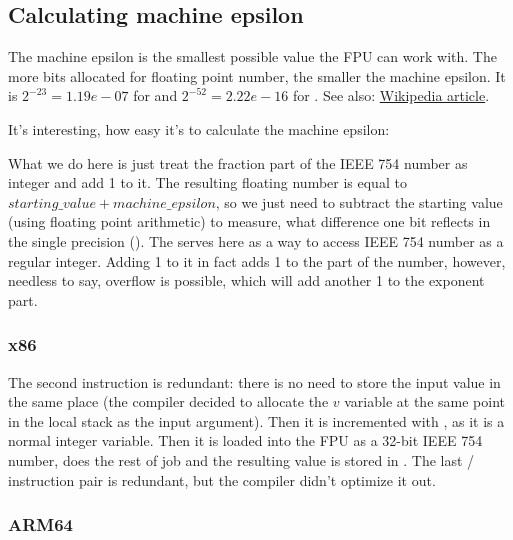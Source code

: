 ﻿\subsection{Calculating machine epsilon}

The machine epsilon is the smallest possible value the \ac{FPU} can work with.
The more bits allocated for floating point number, the smaller the machine epsilon.
It is $2^{-23} = 1.19e-07$ for \Tfloat and $2^{-52} = 2.22e-16$ for \Tdouble.
See also: \href{http://link.yurichev.com/17367}{Wikipedia article}.%

It's interesting, how easy it's to calculate the machine epsilon:



What we do here is just treat the fraction part of the IEEE 754 number as integer and add 1 to it.
The resulting floating number is equal to $starting\_value+machine\_epsilon$, so we just need to subtract
the starting value (using floating point arithmetic) to measure, what difference one bit reflects
in the single precision (\Tfloat).
The  serves here as a way to access IEEE 754 number as a regular integer.
Adding 1 to it in fact adds 1 to the  part of the number, however, needless to say,
overflow is possible, which will add another 1 to the exponent part.

\subsubsection{x86}



The second  instruction is redundant: there is no need to store the input value in the same
place (the compiler decided to allocate the $v$ variable at the same point in the local stack as the input 
argument).
Then it is incremented with , as it is a normal integer variable.
Then it is loaded into the FPU as a 32-bit IEEE 754 number,  does the rest of job and the resulting
value is stored in .
The last / instruction pair is redundant, but the compiler didn't optimize it out.

\subsubsection{ARM64}

